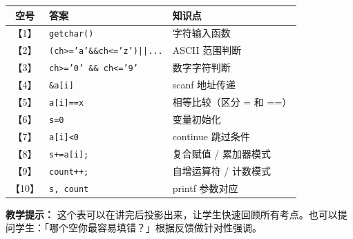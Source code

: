 \begin{table}[h]
    \centering
    \begin{tabular}{@{}cll@{}}
        \toprule
        \textbf{空号} & \textbf{答案}                          & \textbf{知识点}        \\
        \midrule
        【1】         & \texttt{getchar()}                     & 字符输入函数              \\
        【2】         & \texttt{(ch>='a'\&\&ch<='z')||...}    & ASCII 范围判断          \\
        【3】         & \texttt{ch>='0' \&\& ch<='9'}         & 数字字符判断              \\
        【4】         & \texttt{\&a[i]}                        & scanf 地址传递          \\
        【5】         & \texttt{a[i]==x}                       & 相等比较（区分 = 和 ==）     \\
        【6】         & \texttt{s=0}                           & 变量初始化               \\
        【7】         & \texttt{a[i]<0}                        & continue 跳过条件       \\
        【8】         & \texttt{s+=a[i];}                      & 复合赋值 / 累加器模式        \\
        【9】         & \texttt{count++;}                      & 自增运算符 / 计数模式        \\
        【10】        & \texttt{s, count}                      & printf 参数对应          \\
        \bottomrule
    \end{tabular}
\end{table}

\textbf{教学提示：} 这个表可以在讲完后投影出来，让学生快速回顾所有考点。也可以提问学生：「哪个空你最容易填错？」根据反馈做针对性强调。
